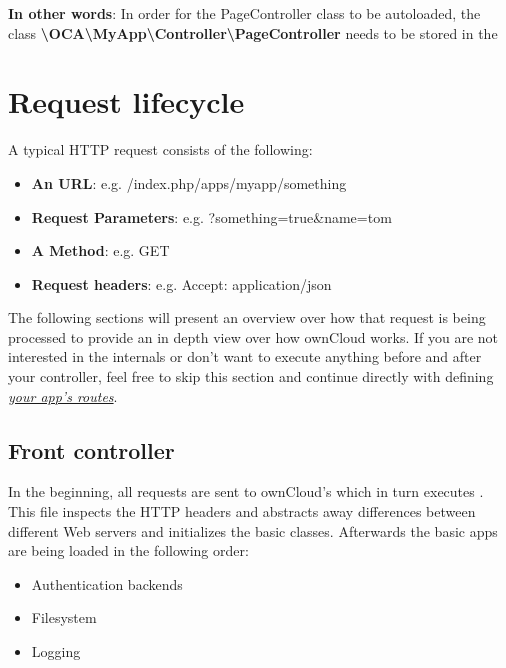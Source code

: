 \documentclass[letterpaper,10pt,english]{sphinxmanual}
\begin{document}
\textbf{In other words}: In order for the PageController class to be autoloaded, the class \textbf{\textbackslash{}OCA\textbackslash{}MyApp\textbackslash{}Controller\textbackslash{}PageController} needs to be stored in the 


\section{Request lifecycle}
\label{app/request:request-lifecycle}\label{app/request::doc}
A typical HTTP request consists of the following:
\begin{itemize}
\item {} 
\textbf{An URL}: e.g. /index.php/apps/myapp/something

\item {} 
\textbf{Request Parameters}: e.g. ?something=true\&name=tom

\item {} 
\textbf{A Method}: e.g. GET

\item {} 
\textbf{Request headers}: e.g. Accept: application/json

\end{itemize}

The following sections will present an overview over how that request is being processed to provide an in depth view over how ownCloud works. If you are not interested in the internals or don't want to execute anything before and after your controller, feel free to skip this section and continue directly with defining {\hyperref[app/routes::doc]{\emph{your app's routes}}}.


\subsection{Front controller}
\label{app/request:front-controller}
In the beginning, all requests are sent to ownCloud's  which in turn executes . This file inspects the HTTP headers and abstracts away differences between different Web servers and initializes the basic classes. Afterwards the basic apps are being loaded in the following order:
\begin{itemize}
\item {} 
Authentication backends

\item {} 
Filesystem

\item {} 
Logging

\end{itemize}
\end{document}
